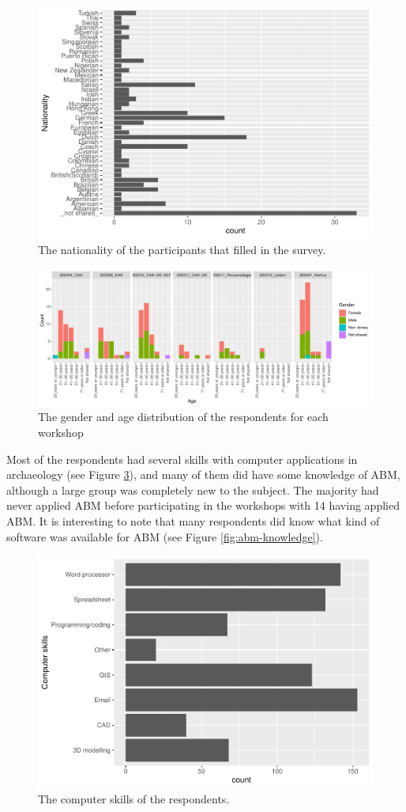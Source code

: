 \documentclass[
]{article}
\begin{document}
\begin{figure}
\centering
\includegraphics{paper_files/figure-latex/nationality-1.pdf}
\caption{\label{fig:nationality}The nationality of the participants that filled in the survey.}
\end{figure}

\begin{figure}
\centering
\includegraphics{paper_files/figure-latex/gender-age-1.pdf}
\caption{\label{fig:gender-age}The gender and age distribution of the respondents for each workshop}
\end{figure}

Most of the respondents had several skills with computer applications in archaeology (see Figure \ref{fig:computer-skills}), and many of them did have some knowledge of ABM, although a large group was completely new to the subject. The majority had never applied ABM before participating in the workshops with 14 having applied ABM. It is interesting to note that many respondents did know what kind of software was available for ABM (see Figure \ref{fig:abm-knowledge}).

\begin{figure}
\includegraphics[width=0.5\linewidth]{paper_files/figure-latex/computer-skills-1} \caption{The computer skills of the respondents.}\label{fig:computer-skills}
\end{figure}
\end{document}
